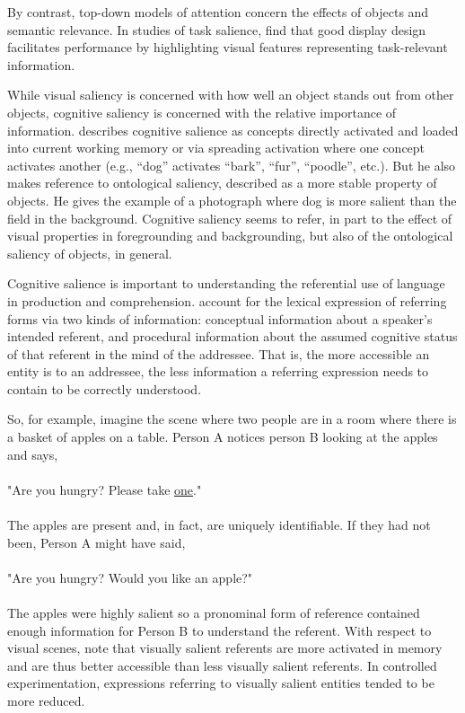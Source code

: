 By contrast, top-down models of attention concern the effects of objects and semantic relevance. In studies of task salience,  \citet*{Hegarty:2010ex}  find that good display design facilitates performance by highlighting visual features representing task-relevant information.

While visual saliency is concerned with how well an object stands out from other objects, cognitive saliency is concerned with the relative importance of information.  \citet{Schmid:2007vq}  describes cognitive salience as concepts directly activated and loaded into current working memory or via spreading activation where one concept activates another (e.g., ``dog'' activates ``bark'', ``fur'', ``poodle'', etc.). But he also makes reference to ontological saliency, described as a more stable property of objects. He gives the example of a photograph where dog is more salient than the field in the background. Cognitive saliency seems to refer, in part to the effect of visual properties in foregrounding and backgrounding, but also of the ontological saliency of objects, in general.

\begin{sloppier}
Cognitive salience is important to understanding the referential use of language in production and comprehension. \citet{Gundel:1993uq,Gundel:2012kq} account for the lexical expression of referring forms via two kinds of information: conceptual information about a speaker's intended referent, and procedural information about the assumed cognitive status of that referent in the mind of the addressee. That is, the more accessible an entity is to an addressee, the less information a referring expression needs to contain to be correctly understood. 
\end{sloppier}
So, for example, imagine the scene where two people are in a room where there is a basket of apples on a table. Person A notices person B looking at the apples and says, 
\\
\\
"Are you hungry? Please take \underline{one}."
\\
\\
The apples are present and, in fact, are uniquely identifiable. If they had not been, Person A might have said, 
\\
\\
"Are you hungry? Would you like an apple?"
\\
\\
The apples were highly salient so a pronominal form of reference contained enough information for Person B to understand the referent. With respect to visual scenes, \citet*{Vogels:2011wj} note that visually salient referents are more activated in memory and are thus better accessible than less visually salient referents. In controlled experimentation, expressions referring to visually salient entities tended to be more reduced. 


